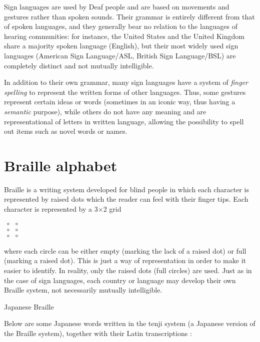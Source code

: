 \begin{refsection}
Sign languages are used by Deaf people and are based on movements and gestures rather than spoken sounds. Their grammar is entirely different from that of spoken languages, and they generally bear no relation to the languages of hearing communities: for instance, the United States and the United Kingdom share a majority spoken language (English), but their most widely used sign languages (American Sign Language/ASL, British Sign Language/BSL) are completely distinct and not mutually intelligible.

In addition to their own grammar, many sign languages have a system of \textit{finger spelling} to represent the written forms of other languages. Thus, some gestures represent certain ideas or words (sometimes in an iconic way, thus having a \textit{semantic} purpose), while others do not have any meaning and are representational of letters in written language, allowing the possibility to spell out items such as novel words or names.

\section{Braille alphabet}

Braille is a writing system developed for blind people in which each character is represented by raised dots which the reader can feel with their finger tips. Each character is represented by a 3$\times$2 grid  
\begin{center}
$\begin{matrix} \circ & \circ \\[-0.5em] \circ&\circ \\[-0.5em]  \circ&\circ\end{matrix}$ 
\end{center}
where each circle can be either empty (marking the lack of a raised dot) or full (marking a raised dot). This is just a way of representation in order to make it easier to identify. In reality, only the raised dots (full circles) are used. Just as in the case of sign languages, each country or language may develop their own Braille system, not necessarily mutually intelligible.\\

\begin{problem}{Japanese Braille}{\namePLittell}{}

Below are some Japanese words written in the tenji system (a Japanese version of the Braille system), together with their Latin transcriptions \OlympiadRandomOrder{}:


\end{problem}
\end{refsection}
